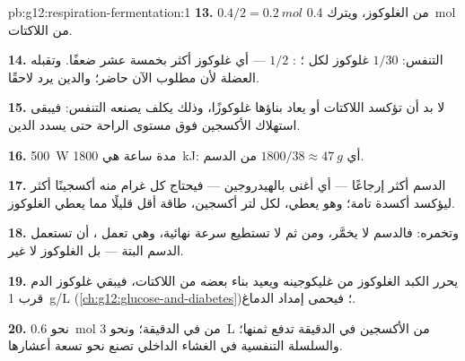 \begin{solution}{pb:g12:respiration-fermentation:1}
\textbf{13.} $0.4/2 = \qty{0.2}{mol}$ من الغلوكوز، ويترك \qty{0.4}{mol}
من اللاكتات.

\textbf{14.} التنفس: $1/30$ غلوكوز لكل ؛ : $1/2$ --- أي
غلوكوز أكثر بخمسة عشر ضعفًا. وتقبله العضلة لأن  مطلوب الآن
 حاضر؛ والدين يرد لاحقًا.

\textbf{15.} لا بد أن تؤكسد اللاكتات أو يعاد بناؤها غلوكوزًا، وذلك
يكلف  يصنعه التنفس: فيبقى استهلاك الأكسجين فوق مستوى الراحة حتى
يسدد الدين.

\textbf{16.} \qty{500}{W} مدة ساعة هي \qty{1800}{kJ}: أي $1800/38
\approx \qty{47}{g}$ من الدسم.

\textbf{17.} الدسم أكثر إرجاعًا --- أي أغنى بالهيدروجين --- فيحتاج كل
غرام منه أكسجينًا أكثر ليؤكسد أكسدة تامة؛ وهو يعطي، لكل لتر أكسجين،
طاقة أقل قليلًا مما يعطي الغلوكوز.

\textbf{18.}  وتخمره: فالدسم لا يخمَّر، ومن ثم لا تستطيع
سرعة نهائية، وهي تعمل ، أن تستعمل الدسم البتة --- بل الغلوكوز
 لا غير.

\textbf{19.} يحرر الكبد الغلوكوز من غليكوجينه ويعيد بناء بعضه من
اللاكتات، فيبقي غلوكوز الدم قرب \qty{1}{g/L}
(\cref{ch:g12:glucose-and-diabetes})؛ فيحمى إمداد الدماغ.

\textbf{20.} نحو \qty{0.6}{mol} من  في الدقيقة؛ ونحو \qty{3}{L} من
الأكسجين في الدقيقة تدفع ثمنها؛ والسلسلة التنفسية في الغشاء الداخلي
 تصنع نحو تسعة أعشارها.
\end{solution}
